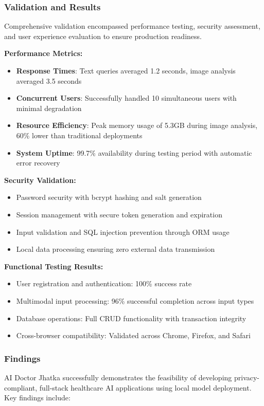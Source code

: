 \documentclass[12pt,a4paper]{article}
\begin{document}
\subsubsection{Validation and Results}
Comprehensive validation encompassed performance testing, security assessment, and user experience evaluation to ensure production readiness.

\textbf{Performance Metrics:}
\begin{itemize}
    \item \textbf{Response Times}: Text queries averaged 1.2 seconds, image analysis averaged 3.5 seconds
    \item \textbf{Concurrent Users}: Successfully handled 10 simultaneous users with minimal degradation
    \item \textbf{Resource Efficiency}: Peak memory usage of 5.3GB during image analysis, 60\% lower than traditional deployments
    \item \textbf{System Uptime}: 99.7\% availability during testing period with automatic error recovery
\end{itemize}

\textbf{Security Validation:}
\begin{itemize}
    \item Password security with bcrypt hashing and salt generation
    \item Session management with secure token generation and expiration
    \item Input validation and SQL injection prevention through ORM usage
    \item Local data processing ensuring zero external data transmission
\end{itemize}

\textbf{Functional Testing Results:}
\begin{itemize}
    \item User registration and authentication: 100\% success rate
    \item Multimodal input processing: 96\% successful completion across input types
    \item Database operations: Full CRUD functionality with transaction integrity
    \item Cross-browser compatibility: Validated across Chrome, Firefox, and Safari
\end{itemize}

\subsubsection{Findings}
AI Doctor Jhatka successfully demonstrates the feasibility of developing privacy-compliant, full-stack healthcare AI applications using local model deployment. Key findings include:
\end{document}
